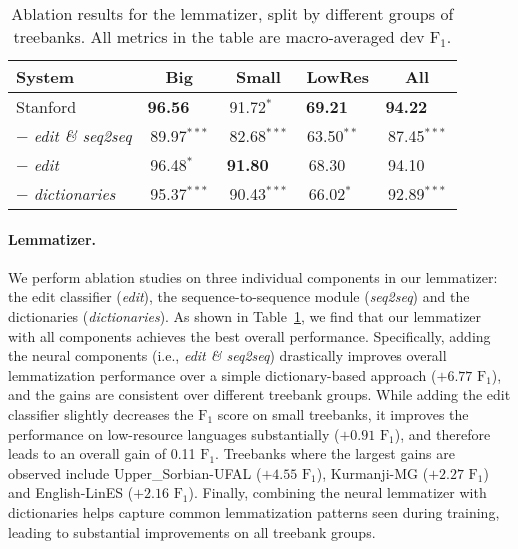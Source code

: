 \documentclass[11pt,a4paper]{article}
\newcommand{\fone}{$\text{F}_1$}
\begin{document}
\begin{table}
\centering
\small
\setlength{\tabcolsep}{0.3em}
\begin{tabular}{lcccc}
\toprule
System & Big & Small & LowRes & All \\
\midrule
Stanford & \textbf{96.56}$^{\phantom{***}}$ & 91.72$^{*\phantom{**}}$ & \textbf{69.21}$^{\phantom{***}}$ & \textbf{94.22}$^{\phantom{***}}$ \\
$-$ \textit{edit \& seq2seq} & 89.97$^{{***}}$ & 82.68$^{{***}}$ & 63.50$^{**\phantom{*}}$ & 87.45$^{{***}}$\\
$-$ \textit{edit} & 96.48$^{*\phantom{**}}$ & \textbf{91.80}$^{\phantom{***}}$ & 68.30$^{\phantom{***}}$ & 94.10$^{\phantom{***}}$\\
$-$ \textit{dictionaries} & 95.37$^{{***}}$ & 90.43$^{{***}}$ & 66.02$^{*\phantom{**}}$ & 92.89$^{{***}}$\\
\bottomrule
\end{tabular}
\caption{Ablation results for the lemmatizer, split by different groups of treebanks. All metrics in the table are macro-averaged dev \fone{}.}
\label{tab:lemma_ablation}
\end{table}

\paragraph{Lemmatizer.}
We perform ablation studies on three individual components in our lemmatizer: the edit classifier (\textit{edit}), the sequence-to-sequence module (\textit{seq2seq}) and the dictionaries (\textit{dictionaries}).
As shown in Table~\ref{tab:lemma_ablation}, we find that our lemmatizer with all components achieves the best overall performance.
Specifically, adding the neural components (i.e., \emph{edit \& seq2seq}) drastically improves overall lemmatization performance over a simple dictionary-based approach ($+6.77$ \fone), and the gains are consistent over different treebank groups.
While adding the edit classifier slightly decreases the \fone{} score on small treebanks, it improves the performance on low-resource languages substantially ($+0.91$ \fone), and therefore leads to an overall gain of 0.11 \fone.
Treebanks where the largest gains are observed include Upper\_Sorbian-UFAL ($+4.55$ \fone), Kurmanji-MG ($+2.27$ \fone) and English-LinES ($+2.16$ \fone).
Finally, combining the neural lemmatizer with dictionaries helps capture common lemmatization patterns seen during training, leading to substantial improvements on all treebank groups.
\end{document}
